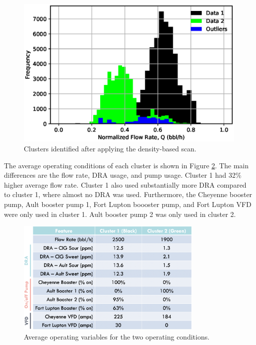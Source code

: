 \begin{figure}[h]
    \centering
    \includegraphics[scale=0.8]{images/08DBSCAN.eps}
    \caption{Clusters identified after applying the density-based scan.}
    \label{fig:08DBSCAN}
\end{figure}

The average operating conditions of each cluster is shown in Figure \ref{fig:08cluster_variables}. The main differences are the flow rate, DRA usage, and pump usage.  Cluster 1 had 32\% higher average flow rate.  Cluster 1 also used substantially more DRA compared to cluster 1, where almost no DRA was used. Furthermore, the Cheyenne booster pump, Ault booster pump 1, Fort Lupton boooster pump, and Fort Lupton VFD were only used in cluster 1.  Ault booster pump 2 was only used in cluster 2.
\begin{figure}
    \centering
    \includegraphics[width=0.8\textwidth]{images/08AvgChar.png}
    \caption{Average operating variables for the two operating conditions.}
    \label{fig:08cluster_variables}
\end{figure}

